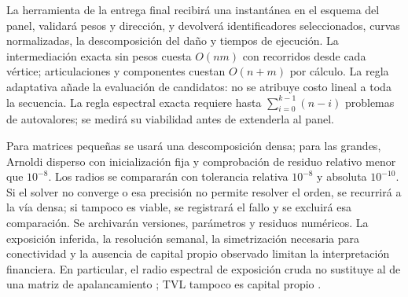 \documentclass[journal]{IEEEtran}
\begin{document}
La herramienta de la entrega final recibirá una instantánea en el esquema del
panel, validará pesos y dirección, y devolverá identificadores seleccionados,
curvas normalizadas, la descomposición del daño y tiempos de ejecución. La
intermediación exacta sin pesos cuesta $O(nm)$ con recorridos desde cada vértice;
articulaciones y componentes cuestan $O(n+m)$ por cálculo. La regla adaptativa
añade la evaluación de candidatos: no se atribuye costo lineal a toda la
secuencia. La regla espectral exacta requiere hasta $\sum_{i=0}^{k-1}(n-i)$
problemas de autovalores; se medirá su viabilidad antes de extenderla al panel.

Para matrices pequeñas se usará una descomposición densa; para las grandes,
Arnoldi disperso con inicialización fija y comprobación de residuo relativo
menor que $10^{-8}$. Los radios se compararán con tolerancia relativa $10^{-8}$
y absoluta $10^{-10}$. Si el solver no converge o esa precisión no permite
resolver el orden, se recurrirá a la vía densa; si tampoco es viable, se
registrará el fallo y se excluirá esa comparación. Se archivarán versiones,
parámetros y residuos numéricos. La exposición inferida, la resolución
semanal, la simetrización necesaria para conectividad y la ausencia de capital
propio observado limitan la interpretación financiera. En particular, el
radio espectral de exposición cruda no sustituye al de una matriz de
apalancamiento \cite{macchiati2024spectral}; TVL tampoco es capital propio
\cite{luo2024piercing}.




\end{document}
